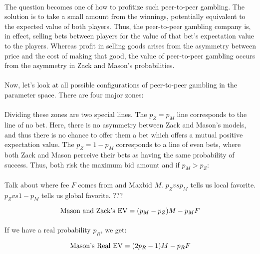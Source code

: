 \documentclass[12pt,letterpaper]{article}
\begin{document}
\paragraph{} The question becomes one of how to profitize such peer-to-peer gambling. The solution is to take a small amount from the winnings, potentially equivalent to the expected value of both players. Thus, the peer-to-peer gambling company is, in effect, selling bets between players for the value of that bet’s expectation value to the players. Whereas profit in selling goods arises from the asymmetry between price and the cost of making that good, the value of peer-to-peer gambling occurs from the asymmetry in Zack and Mason’s probabilities. 

\paragraph{} Now, let’s look at all possible configurations of peer-to-peer gambling in the parameter space. There are four major zones:

\paragraph{} Dividing these zones are two special lines. The $p_Z = p_M$ line corresponds to the line of no bet. Here, there is no asymmetry between Zack and Mason’s models, and thus there is no chance to offer them a bet which offers a mutual positive expectation value. The $p_Z = 1 - p_M$ corresponds to a line of even bets, where both Zack and Mason perceive their bets as having the same probability of success. Thus, both risk the maximum bid amount and if $p_M > p_Z$:

\paragraph{} Talk about where fee $F$ comes from and Maxbid $M$. $p_Z vs p_M$ tells us local favorite. $p_Z vs 1 - p_M$ tells us global favorite. ???

\begin{equation}
\textnormal{Mason and Zack's EV} = (p_M  -  p_Z)M - p_M F
\end{equation}

\paragraph{} If we have a real probability $p_R$, we get:

\begin{equation}
\textnormal{Mason's Real EV} = (2p_R - 1)M - p_R F
\end{equation}
\end{document}
